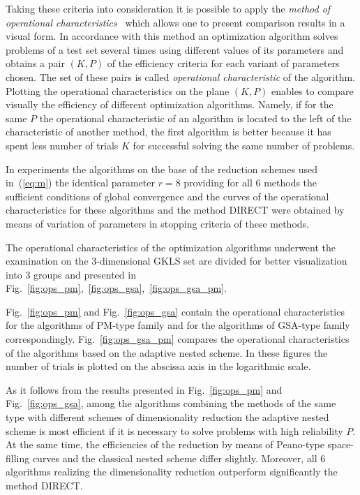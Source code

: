 \documentclass[preprint]{elsarticle}
\begin{document}
Taking these criteria into consideration it is possible to apply the \emph{method of operational characteristics}~\cite{bib39,bib52} which allows one to present comparison results in a visual form. In accordance with this method an optimization algorithm solves problems of a test set several times using different values of its parameters and obtains a pair $(K, P)$ of the efficiency criteria for each variant of parameters chosen. The set of these pairs is called \emph{operational characteristic} of the algorithm. Plotting the operational characteristics on the plane $(K, P)$ enables to compare visually the efficiency of different optimization algorithms. Namely, if for the same $P$ the operational characteristic of an algorithm is located to the left of the characteristic of another method, the first algorithm is better because it has spent less number of trials $K$ for successful solving the same number of problems.

In experiments the algorithms on the base of the reduction schemes used in~(\ref{eq:m}) the identical parameter $r = 8$ providing for all 6 methods the sufficient  conditions of global convergence  and the curves of the operational characteristics for these algorithms and the method DIRECT were obtained by means of variation of parameters in stopping criteria of these methods.

The operational characteristics of the optimization algorithms underwent the examination on the 3-dimensional GKLS set are divided for better visualization into 3 groups and presented in Fig.~\ref{fig:ops_pm},~\ref{fig:ops_gsa},~\ref{fig:ops_gsa_pm}.

Fig.~\ref{fig:ops_pm} and Fig.~\ref{fig:ops_gsa} contain the operational characteristics for the algorithms of PM-type family and for the algorithms of GSA-type family correspondingly. Fig.~\ref{fig:ops_gsa_pm} compares the operational characteristics of the algorithms based on the adaptive nested scheme. In these figures the number of trials is plotted on the abscissa axis in the logarithmic scale.

As it follows from the results presented in Fig.~\ref{fig:ops_pm} and Fig.~\ref{fig:ops_gsa}, among the algorithms combining the methods of the same type with different schemes of dimensionality reduction the adaptive nested scheme is most efficient if it is necessary to solve problems with high reliability $P$. At the same time, the efficiencies of the reduction by means of Peano-type space-filling curves and the classical nested scheme differ slightly. Moreover, all 6 algorithms realizing the dimensionality reduction outperform significantly the method DIRECT.
\end{document}
